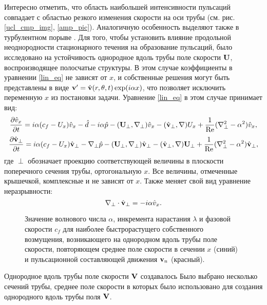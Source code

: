 Интересно отметить, что область наибольшей интенсивности пульсаций совпадает с областью резкого изменения скорости на оси трубы (см. рис. \ref{ucl_cmp_img}, \ref{amp_pic}). Аналогичную особенность выделяют также в турбулентном порыве \cite{Hof2010}. Для того, чтобы установить влияние продольной неоднородности стационарного течения на образование пульсаций, было исследовано на устойчивость однородное вдоль трубы поле скорости $\mathbf{U}$, воспроизводящее полосчатые структуры. В этом случае коэффициенты в уравнении \eqref{lin_eq} не зависят от $x$, и собственные решения могут быть представлены в виде $\mathbf{v}' = \hat {\mathbf{v}}(r,\theta,t) \exp(i \alpha x)$, что позволяет исключить переменную $x$ из постановки задачи. Уравнение \eqref{lin_eq} в этом случае принимает вид:
\begin{equation*}
\frac{\partial \hat v_x}{\partial t} =  i \alpha (c_f - U_x) \hat v_x - \hat d - i \alpha \hat p - (\mathbf{U}_{\perp},\nabla_{\perp}) \hat v_x - 
(\hat {\mathbf{v}}_{\perp}, \nabla) U_x  + \frac{1}{\operatorname{Re}}( \nabla_{\perp}^2 - \alpha^2 ) \hat v_x,
\end{equation*}
\begin{equation*}
\frac{\partial \hat {\mathbf{v}}_{\perp}}{\partial t} = i \alpha (c_f - U_x) \hat {\mathbf{v}}_{\perp}  - \nabla_{\perp} \hat p - (\mathbf{U}_{\perp},\nabla_{\perp}) 
\hat {\mathbf{v}}_{\perp} - (\hat {\mathbf{v}}_{\perp}, \nabla) \mathbf{U}_{\perp} + \frac{1}{\operatorname{Re}}( \nabla_{\perp}^2 - \alpha^2 ) \hat {\mathbf{v}}_{\perp}, 
\end{equation*}
где $\perp$ обозначает проекцию соответствующей величины в плоскости поперечного сечения трубы, ортогональную $x$. Все величины, отмеченные крышечкой, комплексные и не зависят от $x$. Также меняет свой вид уравнение неразрывности:
\begin{equation*}
\nabla_{\perp} \cdot \hat {\mathbf{v}}_{\perp} = - i \alpha \hat v_x. 
\end{equation*}


\begin{figure}[h]
\caption{Значение волнового числа $\alpha$, инкремента нарастания $\lambda$ и фазовой скорости $c_f$ для наиболее быстрорастущего собственного возмущения, возникающего на однородном вдоль трубы поле скорости, повторяющем среднее поле скорости в сечении $x$ (синий) и пульсационной составляющей движения $\mathbf{v}_n$ (красный).}
\label{cs_lin_pic}
\end{figure}



Однородное вдоль трубы поле скорости $\mathbf{V}$ создавалось 
Было выбрано несколько сечений трубы, среднее поле скорости в которых было использовано для создания однородного вдоль трубы поля $\mathbf{V}$. 

